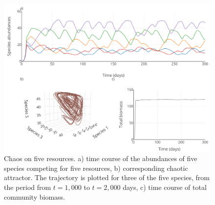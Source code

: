 \begin{figure}[H]
\begin{center} 
 \includegraphics[width=1\textwidth]{../Code/Figures/Figure_2.pdf}
  \caption{Chaos on five resources. a) time course of the abundances of five species competing for five resources, b) corresponding chaotic attractor. The trajectory is plotted for three of the five species, from the period from $t= 1,000$ to $t=2,000$ days, c) time course of total community biomass.}
  \label{figures:Fig2}
\end{center}
\end{figure}


